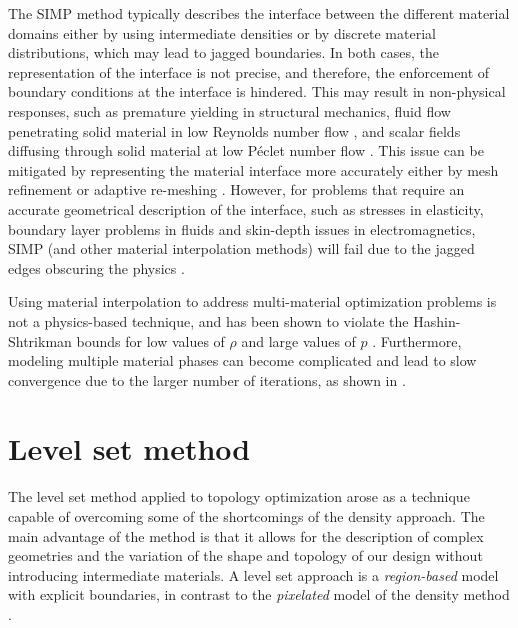 
The SIMP method typically describes the interface between the different material domains either by using intermediate densities or by discrete material distributions, which may lead to jagged boundaries. In both cases, the representation of the interface is not precise, and therefore, the enforcement of boundary conditions at the interface is hindered. This may result in non-physical responses, such as premature yielding \citep{MSR:98} in structural mechanics, fluid flow penetrating solid material in low Reynolds number flow \citep{KPM:11}, and scalar fields diffusing through solid material at low P\'{e}clet number flow \citep{MPY+:12}. This issue can be mitigated by representing the material interface more accurately either by mesh refinement or adaptive re-meshing \citep{MR:95,MR:97}. However, for problems that require an accurate geometrical description of the interface, such as stresses in elasticity, boundary layer problems in fluids and skin-depth issues in electromagnetics, SIMP (and other material interpolation methods) will fail due to the jagged edges obscuring the physics \citep{ES:11,YNK+:11}.

Using material interpolation to address multi-material optimization problems is not a physics-based technique, and has been shown to violate the Hashin-Shtrikman bounds for low values of $\rho$ and large values of $p$ \citep{HS:62}. Furthermore, modeling multiple material phases can become complicated \citep{YA:01} and lead to slow convergence due to the larger number of iterations, as shown in \citep{VM:14}.


\section{Level set method}
\label{sec:intro_level_set_method}

The level set method applied to topology optimization arose as a technique capable of overcoming some of the shortcomings of the density approach. The main advantage of the method is that it allows for the description of complex geometries and the variation of the shape and topology of our design without introducing intermediate materials. A level set approach is a \textit{region-based} model with explicit boundaries, in contrast to the \textit{pixelated} model of the density method \citep{WW:04c}.

